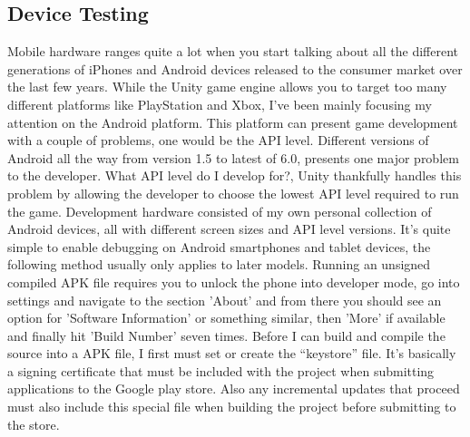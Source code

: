 \subsection{Device Testing}
Mobile hardware ranges quite a lot when you start talking about all the different generations of iPhones and Android devices released to the consumer market over the last few years. While the Unity game engine allows you to target too many different platforms like PlayStation and Xbox, I’ve been mainly focusing my attention on the Android platform. This platform can present game development with a couple of problems, one would be the API level. Different versions of Android all the way from version 1.5 to latest of 6.0, presents one major problem to the developer. What API level do I develop for?, Unity thankfully handles this problem by allowing the developer to choose the lowest API level required to run the game.
Development hardware consisted of my own personal collection of Android devices, all with different screen sizes and API level versions. It’s quite simple to enable debugging on Android smartphones and tablet devices, the following method usually only applies to later models. Running an unsigned compiled APK file requires you to unlock the phone into developer mode, go into settings and navigate to the section 'About' and from there you should see an option for 'Software Information' or something similar, then 'More' if available and finally hit 'Build Number' seven times. Before I can build and compile the source into a APK file, I first must set or create the “keystore” file. It’s basically a signing certificate that must be included with the project when submitting applications to the Google play store. Also any incremental updates that proceed must also include this special file when building the project before submitting to the store.

